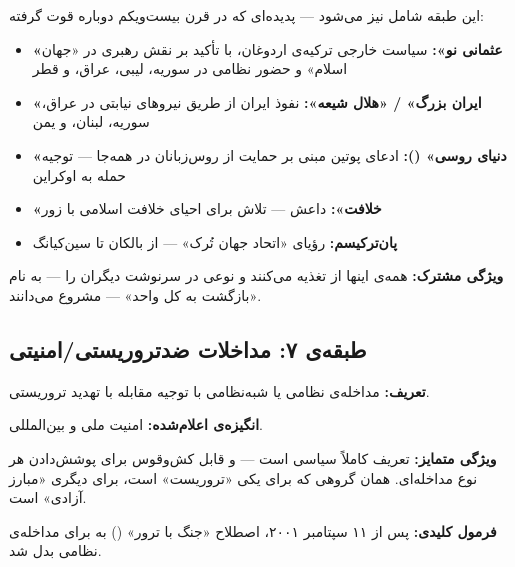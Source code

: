 \begin{tcolorbox}[defbox, title={ایران بزرگ، عثمانی نو، و رؤیاهای دیگر}]
این طبقه شامل  نیز می‌شود — پدیده‌ای
که در قرن بیست‌ویکم دوباره قوت گرفته:

\begin{itemize}
\item \textbf{«عثمانی نو»:} سیاست خارجی ترکیه‌ی اردوغان، با تأکید بر
  نقش رهبری در «جهان اسلام» و حضور نظامی در سوریه، لیبی، عراق، و قطر
\item \textbf{«ایران بزرگ» / «هلال شیعه»:} نفوذ ایران از طریق نیروهای
  نیابتی در عراق، سوریه، لبنان، و یمن
\item \textbf{«دنیای روسی» ():} ادعای پوتین مبنی بر
  حمایت از روس‌زبانان در همه‌جا — توجیه حمله به اوکراین
\item \textbf{«خلافت»:} داعش — تلاش برای احیای خلافت اسلامی با زور
\item \textbf{پان‌ترکیسم:} رؤیای «اتحاد جهان تُرک» — از بالکان تا
  سین‌کیانگ
\end{itemize}

\textbf{ویژگی مشترک:} همه‌ی اینها از  تغذیه
می‌کنند و نوعی  در سرنوشت دیگران را — به نام «بازگشت به
کل واحد» — مشروع می‌دانند.
\end{tcolorbox}


\subsection{طبقه‌ی ۷: مداخلات ضدتروریستی/امنیتی}
\label{sec:tax-type7}

\begin{tcolorbox}[casebox, title={تعریف و ویژگی‌ها}]
\textbf{تعریف:} مداخله‌ی نظامی یا شبه‌نظامی با توجیه مقابله با تهدید
تروریستی.

\textbf{انگیزه‌ی اعلام‌شده:} امنیت ملی و بین‌المللی.

\textbf{ویژگی متمایز:} تعریف  کاملاً سیاسی است — و
قابل کش‌وقوس برای پوشش‌دادن هر نوع مداخله‌ای. همان گروهی که برای یکی
«تروریست» است، برای دیگری «مبارز آزادی» است.

\textbf{فرمول کلیدی:} پس از ۱۱ سپتامبر ۲۰۰۱، اصطلاح «جنگ با ترور»
() به  برای مداخله‌ی نظامی
بدل شد.
\end{tcolorbox}

